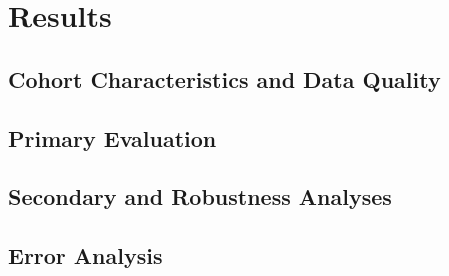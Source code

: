\chapter{Results}
\label{ch:results}

\section{Cohort Characteristics and Data Quality}

\section{Primary Evaluation}

\section{Secondary and Robustness Analyses}

\section{Error Analysis}
